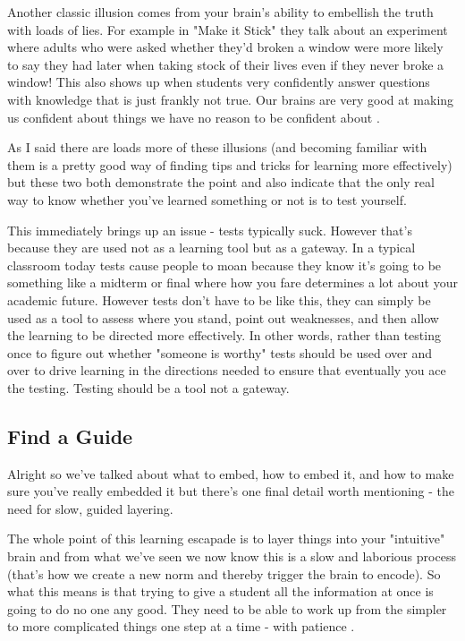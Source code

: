 \documentclass[11pt,a5paper]{book}
\begin{document}
Another classic illusion comes from your brain's ability to embellish the truth with loads of lies. For example in "Make it Stick" they talk about an experiment where adults who were asked whether they'd broken a window were more likely to say they had later when taking stock of their lives even if they never broke a window! This also shows up when students very confidently answer questions with knowledge that is just frankly not true. Our brains are very good at making us confident about things we have no reason to be confident about \cite{stick}. 
\newline

As I said there are loads more of these illusions (and becoming familiar with them is a pretty good way of finding tips and tricks for learning more effectively) but these two both demonstrate the point and also indicate that the only real way to know whether you've learned something or not is to test yourself. 
\newline

This immediately brings up an issue - tests typically suck. However that's because they are used not as a learning tool but as a gateway. In a typical classroom today tests cause people to moan because they know it's going to be something like a midterm or final where how you fare determines a lot about your academic future. However tests don't have to be like this, they can simply be used as a tool to assess where you stand, point out weaknesses, and then allow the learning to be directed more effectively. In other words, rather than testing once to figure out whether "someone is worthy" tests should be used over and over to drive learning in the directions needed to ensure that eventually you ace the testing. Testing should be a tool not a gateway.

\subsection{Find a Guide}
Alright so we've talked about what to embed, how to embed it, and how to make sure you've really embedded it but there's one final detail worth mentioning - the need for slow, guided layering. 
\newline

The whole point of this learning escapade is to layer things into your "intuitive" brain and from what we've seen we now know this is a slow and laborious process (that's how we create a new norm and thereby trigger the brain to encode). So what this means is that trying to give a student all the information at once is going to do no one any good. They need to be able to work up from the simpler to more complicated things one step at a time - with patience \cite{ericsson}. 
\newline
\end{document}
